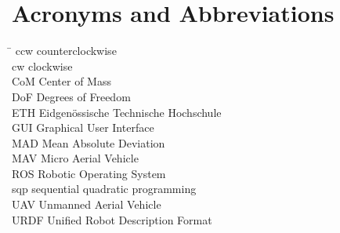 
\section*{Acronyms and Abbreviations}
\begin{tabbing}
 \hspace*{1.6cm}  \= \kill
 ccw\> counterclockwise \\[0.5ex]
 cw\> clockwise \\[0.5ex]
 CoM \> Center of Mass \\[0.5ex]
 DoF \> Degrees of Freedom \\[0.5ex]
 ETH \> Eidgenössische Technische Hochschule \\[0.5ex]
 GUI \> Graphical User Interface \\[0.5ex]
 MAD \> Mean Absolute Deviation \\[0.5ex]
 MAV \> Micro Aerial Vehicle \\[0.5ex]
 ROS \> Robotic Operating System \\[0.5ex]
 sqp \> sequential quadratic programming \\[0.5ex]
 UAV \> Unmanned Aerial Vehicle \\[0.5ex]
 URDF \> Unified Robot Description Format \\[0.5ex]
\end{tabbing}
